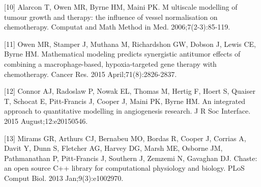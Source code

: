 \documentclass[fullpage,11pt]{article}
\begin{document}
[10] Alarcon T, Owen MR, Byrne HM, Maini PK. M ultiscale modelling of tumour growth and therapy: the influence of vessel normalisation on chemotherapy. Computat and Math Method in Med. 2006;7(2-3):85-119.

[11] Owen MR, Stamper J, Muthana M, Richardshon GW, Dobson J, Lewis CE, Byrne HM. Mathematical modeling predicts synergistic antitumor effects of combining a macrophage-based, hypoxia-targeted gene therapy with chemotherapy. Cancer Res. 2015 April;71(8):2826-2837.

[12] Connor AJ, Radoslaw P, Nowak EL, Thomas M, Hertig F, Hoert S, Quaiser T, Schocat E, Pitt-Francis J, Cooper J, Maini PK, Byrne HM. An integrated approach to quantitative modelling in angiogenesis research. J R Soc Interface. 2015 August;12:e20150546.

[13] Mirams GR, Arthurs CJ, Bernabeu MO, Bordas R, Cooper J, Corrias A, Davit Y, Dunn S, Fletcher AG, Harvey DG, Marsh ME, Osborne JM, Pathmanathan P, Pitt-Francis J, Southern J, Zemzemi N, Gavaghan DJ. Chaste: an open source C++ library for computational physiology and biology. PLoS Comput Biol. 2013 Jan;9(3):e1002970.





  
\end{document}
